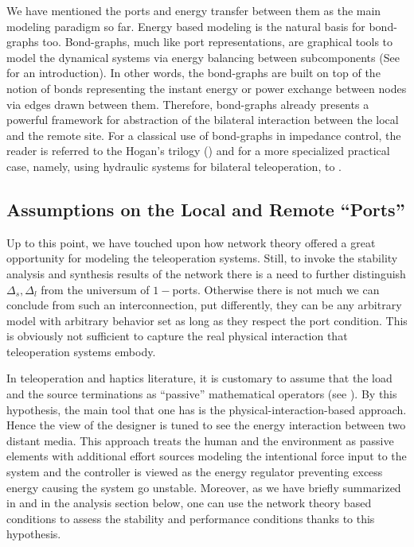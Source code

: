 We have mentioned the ports and energy transfer between them as the main modeling paradigm so far. Energy based modeling is 
the natural basis for bond-graphs too. Bond-graphs, much like port representations, are graphical tools to model the dynamical 
systems via energy balancing between subcomponents (See \cite{gawthrop} for an introduction). In other words, the bond-graphs are built on top of the notion 
of bonds representing the instant energy or power exchange between nodes via edges drawn between them. Therefore, bond-graphs
already presents a powerful framework for abstraction of the bilateral interaction between the local and the remote site. For a 
classical use of bond-graphs in impedance control, the reader is referred to the Hogan's trilogy (\cite{hogan:1,hogan:2,hogan:3}) and 
for a more specialized practical case, namely, using hydraulic systems for bilateral teleoperation, to \cite{krishnaswamy}. 



\subsection{Assumptions on the Local and Remote ``Ports''}

Up to this point, we have touched upon how network theory offered a great opportunity for modeling the 
teleoperation systems. Still, to invoke the stability analysis and synthesis results of the network there is a need to further distinguish
$\Delta_s,\Delta_l$ from the universum of $1-$ports. Otherwise there is not much we can conclude from such an 
interconnection, put differently, they can be any arbitrary model with arbitrary behavior set as long as they respect the port 
condition. This is obviously not sufficient to capture the real physical interaction that teleoperation systems embody. 

In teleoperation and haptics literature, it is customary to assume that the load and the source terminations as ``passive''
mathematical operators (see ). By this hypothesis, the main tool that one has is the physical-interaction-based approach. 
Hence the view of the designer is tuned to see the energy interaction between two distant media. This approach treats the human and the 
environment as passive elements with additional effort sources modeling the intentional force input to the system and the 
controller is viewed as the energy regulator preventing excess energy causing the system go unstable. Moreover, as we have
briefly summarized in  and in the analysis section below, one can use the network theory based conditions 
to assess the stability and performance conditions thanks to this hypothesis.


